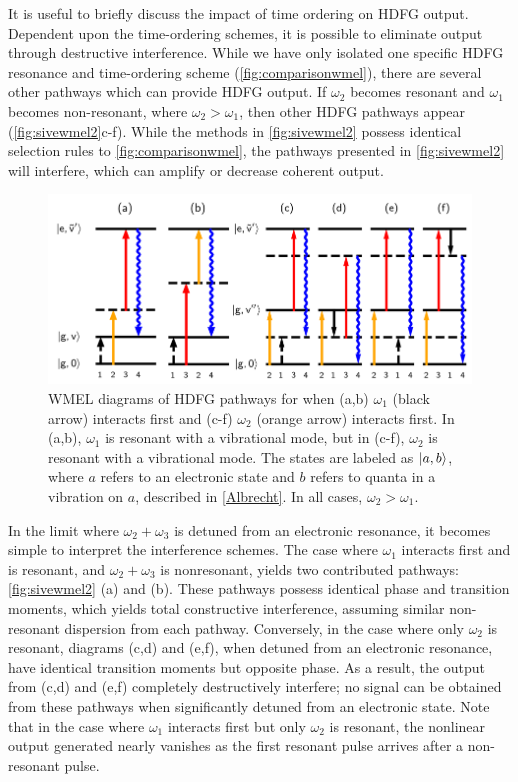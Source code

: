 \documentclass[aip, jcp, reprint, onecolumn, nofootinbib]{revtex4-2}
\begin{document}
It is useful to briefly discuss the impact of time ordering on HDFG output.
Dependent upon the time-ordering schemes, it is possible to eliminate output through destructive interference.\cite{Cho2008}
While we have only isolated one specific HDFG resonance and time-ordering scheme (\autoref{fig:comparisonwmel}), there are several other pathways which can provide HDFG output. \cite{RN352}
If $\omega_2$ becomes resonant and $\omega_1$ becomes non-resonant, where $\omega_2 > \omega_1$, then other HDFG pathways appear (\autoref{fig:sivewmel2}c-f).\cite{McDonnell2024} 
While the methods in \autoref{fig:sivewmel2} possess identical selection rules to \autoref{fig:comparisonwmel}, the pathways presented in \autoref{fig:sivewmel2} will interfere, which can amplify or decrease coherent output.
\begin{figure}[!htbp]
	\centering
	\includegraphics[width=\textwidth]{figures/timeorderedwmel.png}
	\caption{WMEL diagrams of HDFG pathways for when (a,b) $\omega_1$ (black arrow) interacts first and (c-f) $\omega_2$ (orange arrow) interacts first. 
		In (a,b), $\omega_1$ is resonant with a vibrational mode, but in (c-f), $\omega_2$ is resonant with a vibrational mode.
		The states are labeled as $\ket{a,b}$, where $a$ refers to an electronic state and $b$ refers to quanta in a vibration on $a$, described in \autoref{Albrecht}.
		In all cases, $\omega_2 > \omega_1$.
	}
	\label{fig:sivewmel2}
\end{figure}

In the limit where $\omega_2+\omega_3$ is detuned from an electronic resonance, it becomes simple to interpret the interference schemes. 
The case where $\omega_1$ interacts first and is resonant, and $\omega_2 + \omega_3$ is nonresonant, yields two contributed pathways: \autoref{fig:sivewmel2} (a) and (b).
These pathways possess identical phase and transition moments, which yields total constructive interference, assuming similar non-resonant dispersion from each pathway.
Conversely, in the case where only $\omega_2$ is resonant, diagrams (c,d) and (e,f), when detuned from an electronic resonance, have identical transition moments but opposite phase. 
As a result, the output from (c,d) and (e,f) completely destructively interfere; no signal can be obtained from these pathways when significantly detuned from an electronic state. \cite{McDonnell2024}
Note that in the case where $\omega_1$ interacts first but only $\omega_2$ is resonant, the nonlinear output generated nearly vanishes as the first resonant pulse arrives after a non-resonant pulse.
\end{document}
